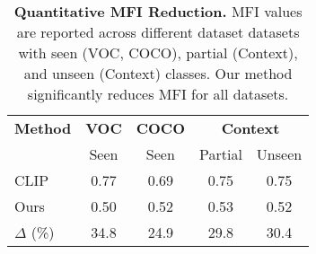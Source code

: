 

\begin{table}[tp]
\centering
\caption{\textbf{Quantitative MFI Reduction.} 
MFI values are reported across different dataset datasets with seen (VOC, COCO), partial (Context), and unseen (Context) classes. Our method significantly reduces MFI for all datasets. }
\small
\begin{tabular}{lcccc} %
\toprule
\textbf{Method} & \multicolumn{1}{c}{\textbf{VOC}}  & \multicolumn{1}{c}{\textbf{COCO}}  & \multicolumn{2}{c}{\textbf{Context}} \\ 
\cmidrule(lr){2-2} \cmidrule(lr){3-3} \cmidrule(lr){4-5}  
 & Seen  & Seen & Partial & Unseen \\ %
\midrule
CLIP        & 0.77 & 0.69 & 0.75 & 0.75  \\ %
Ours        & 0.50 & 0.52 & 0.53 & 0.52  \\
\rowcolor{lightgray!45} $\Delta$ (\%)  & 34.8  & 24.9  & 29.8  & 30.4  \\
\bottomrule
\end{tabular}
\label{tab:mfi_reduction}
\end{table}